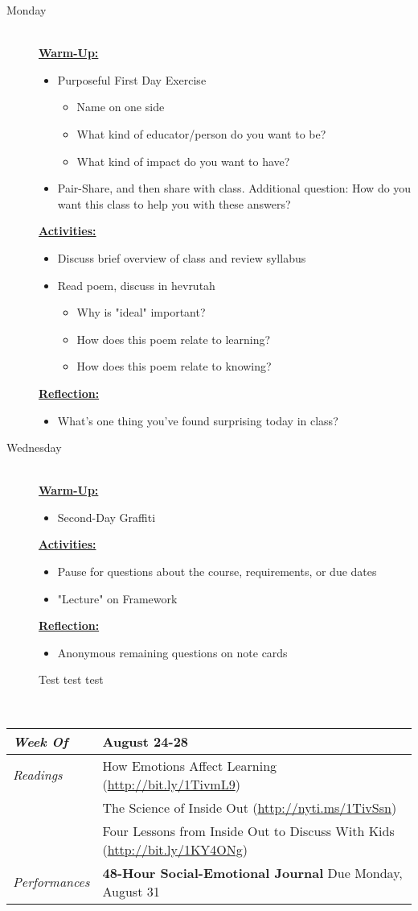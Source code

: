 \documentclass{article}
\newcommand{\tabread}{\faBook\medspace\textit{Readings}}
\newcommand{\tabperformance}{\faTasks\medspace\textit{Performances}}
\newcommand{\tabdt}{\faCalendar\medspace\textit{Week Of}}
\newcommand{\tabbreak}{\begin{center}\faAsterisk\faAsterisk\faAsterisk\\\end{center}}
\newenvironment{tabsched}
	{\small
	\begin{tabular}{p{1.5in}p{4.5in}}
	\midrule}
	{\midrule
	\end{tabular}
	\normalsize}
\newcommand{\weektwo}{August 24-28}
\newcommand{\listmon}{\item[Monday] \hfill \\}
\newcommand{\listwed}{\item[Wednesday] \hfill \\}
\newenvironment{daywu}
	{\textbf{\underline{Warm-Up:}} \hfill \\
	\begin{itemize}}
	{\end{itemize}}
\newenvironment{dayact}
	{\textbf{\underline{Activities:}} \hfill \\
	\begin{itemize}}
	{\end{itemize}}
\newenvironment{dayref}
	{\textbf{\underline{Reflection:}} \hfill \\
	\begin{itemize}}
	{\end{itemize}}
\newenvironment{weeksched}
	{\noindent
	\begin{description}}
	{\end{description}
	\newpage}
\begin{document}
\begin{weeksched}

\listmon
\begin{daywu}
	\item Purposeful First Day Exercise
		\begin{itemize}
			\item Name on one side
			\item What kind of educator/person do you want to be?
			\item What kind of impact do you want to have?
		\end{itemize}
	\item Pair-Share, and then share with class. Additional question: How do you want this class to help you with these answers?
\end{daywu}
\begin{dayact}
	\item Discuss brief overview of class and review syllabus
	\item Read poem, discuss in hevrutah
	\begin{itemize}
		\item Why is "ideal" important?
		\item How does this poem relate to learning?
		\item How does this poem relate to knowing?
	\end{itemize}
\end{dayact}
\begin{dayref}
	\item What's one thing you've found surprising today in class?
\end{dayref}

\listwed
\begin{daywu}
	\item Second-Day Graffiti
\end{daywu}
\begin{dayact}
	\item Pause for questions about the course, requirements, or due dates
	\item "Lecture" on Framework
\end{dayact}
\begin{dayref}
	\item Anonymous remaining questions on note cards
\end{dayref}
\textsf{Test test test}

\end{weeksched}
\tabbreak

\begin{tabsched}
	\tabdt & \weektwo \\
	\midrule
	\tabread & How Emotions Affect Learning (\url{http://bit.ly/1TivmL9})\\
	& The Science of Inside Out (\url{http://nyti.ms/1TivSsn})\\
	& Four Lessons from Inside Out to Discuss With Kids (\url{http://bit.ly/1KY4ONg})\\
	\midrule
	\tabperformance & \textbf{48-Hour Social-Emotional Journal} Due Monday, August 31 \\
\end{tabsched}
\end{document}
